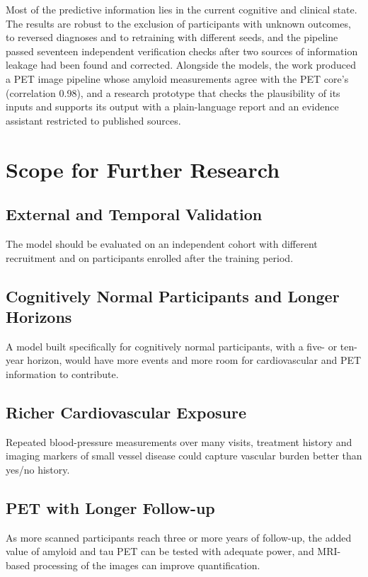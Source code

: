 Most of the predictive information lies in the current cognitive and clinical state. The results are robust to the exclusion of participants with unknown outcomes, to reversed diagnoses and to retraining with different seeds, and the pipeline passed seventeen independent verification checks after two sources of information leakage had been found and corrected. Alongside the models, the work produced a PET image pipeline whose amyloid measurements agree with the PET core's (correlation 0.98), and a research prototype that checks the plausibility of its inputs and supports its output with a plain-language report and an evidence assistant restricted to published sources.

\section{Scope for Further Research}

\subsection{External and Temporal Validation}
The model should be evaluated on an independent cohort with different recruitment and on participants enrolled after the training period.

\subsection{Cognitively Normal Participants and Longer Horizons}
A model built specifically for cognitively normal participants, with a five- or ten-year horizon, would have more events and more room for cardiovascular and PET information to contribute.

\subsection{Richer Cardiovascular Exposure}
Repeated blood-pressure measurements over many visits, treatment history and imaging markers of small vessel disease could capture vascular burden better than yes/no history.

\subsection{PET with Longer Follow-up}
As more scanned participants reach three or more years of follow-up, the added value of amyloid and tau PET can be tested with adequate power, and MRI-based processing of the images can improve quantification.

